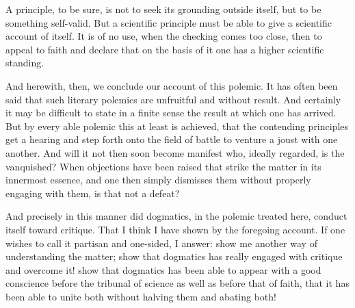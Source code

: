 \documentclass[12pt,a4paper]{book}
\newcommand{\opage}[1]{\marginnote{\footnotesize\textit{[#1]}}}
\begin{document}
A principle, to be sure, is not to seek its grounding outside
itself, but to be something self-valid. But a scientific principle
must be able to give a scientific account of itself. It is of no use,
when the checking comes too close, then to appeal to
faith and declare that on the basis of it one has a higher
scientific standing.

And herewith, then, we conclude our account of this polemic.
It has often been said that such literary polemics are
unfruitful and without result. And certainly it may be difficult
to state in a finite sense the result at which one
has arrived. But by every able polemic this at least is achieved,
that the contending principles get a hearing and step
forth onto the field of battle to venture a joust with one another. And
will it not then soon become manifest who,
ideally regarded, is the vanquished? When objections have been raised
that strike the matter in its innermost essence, and one
then simply dismisses them without properly engaging with them, is
that not a defeat?

\opage{36}\setcounter{footnote}{0}%
And precisely in this manner did dogmatics, in the
polemic treated here, conduct itself toward critique. That I think I
have shown by the foregoing account. If one wishes to call it
partisan and one-sided, I answer: show me another way
of understanding the matter; show that dogmatics has really engaged
with critique and overcome it! show that dogmatics has
been able to appear with a good conscience before the tribunal of science
as well as before that of faith, that it has been able to unite both
without halving them and abating both!
\end{document}
